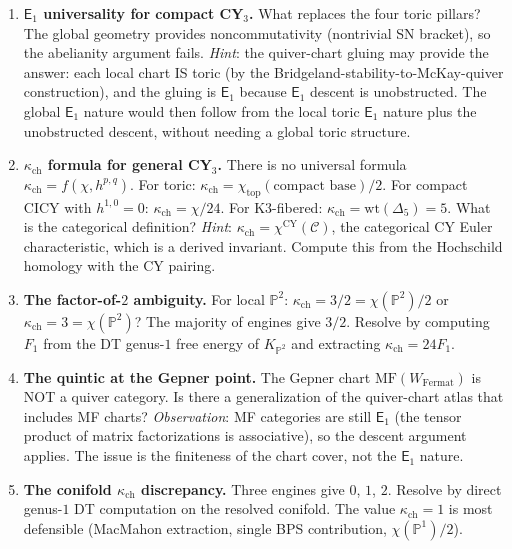 \documentclass[11pt]{article}
\newcommand{\cC}{\mathcal{C}}
\newcommand{\bP}{\mathbb{P}}
\newcommand{\Eone}{\mathsf{E}_1}
\newcommand{\CY}{\mathrm{CY}}
\newcommand{\MF}{\mathrm{MF}}
\begin{document}
\begin{enumerate}[label=\textbf{Q\arabic*.}]
\item \textbf{$\Eone$ universality for compact CY$_3$.} What replaces the four toric pillars?
 The global geometry provides noncommutativity (nontrivial SN bracket), so the abelianity argument
 fails. \emph{Hint}: the quiver-chart gluing may provide the answer: each local chart IS toric
 (by the Bridgeland-stability-to-McKay-quiver construction), and the gluing is $\Eone$ because
 $\Eone$ descent is unobstructed. The global $\Eone$ nature would then follow from the local toric
 $\Eone$ nature plus the unobstructed descent, without needing a global toric structure.

\item \textbf{$\kappa_{\mathrm{ch}}$ formula for general CY$_3$.} There is no universal formula $\kappa_{\mathrm{ch}} = f(\chi, h^{p,q})$.
 For toric: $\kappa_{\mathrm{ch}} = \chi_{\mathrm{top}}(\text{compact base})/2$. For compact CICY with $h^{1,0} = 0$: $\kappa_{\mathrm{ch}} = \chi/24$.
 For K3-fibered: $\kappa_{\mathrm{ch}} = \mathrm{wt}(\Delta_5) = 5$. What is the categorical definition?
 \emph{Hint}: $\kappa_{\mathrm{ch}} = \chi^{\CY}(\cC)$, the categorical CY Euler characteristic, which is a
 derived invariant. Compute this from the Hochschild homology with the CY pairing.

\item \textbf{The factor-of-$2$ ambiguity.} For local $\bP^2$: $\kappa_{\mathrm{ch}} = 3/2 = \chi(\bP^2)/2$
 or $\kappa_{\mathrm{ch}} = 3 = \chi(\bP^2)$? The majority of engines give $3/2$. Resolve by computing
 $F_1$ from the DT genus-$1$ free energy of $K_{\bP^2}$ and extracting $\kappa_{\mathrm{ch}} = 24 F_1$.

\item \textbf{The quintic at the Gepner point.} The Gepner chart $\MF(W_{\mathrm{Fermat}})$ is NOT a
 quiver category. Is there a generalization of the quiver-chart atlas that includes MF charts?
 \emph{Observation}: MF categories are still $\Eone$ (the tensor product of matrix factorizations is
 associative), so the descent argument applies. The issue is the finiteness of the chart cover,
 not the $\Eone$ nature.

\item \textbf{The conifold $\kappa_{\mathrm{ch}}$ discrepancy.} Three engines give $0$, $1$, $2$. Resolve by
 direct genus-$1$ DT computation on the resolved conifold. The value $\kappa_{\mathrm{ch}} = 1$ is most
 defensible (MacMahon extraction, single BPS contribution, $\chi(\bP^1)/2$).


\end{enumerate}
\end{document}
